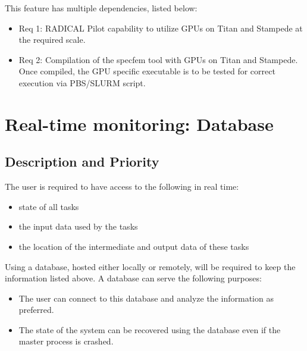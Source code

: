 \documentclass{scrreprt}
\begin{document}

This feature has multiple dependencies, listed below:

\begin{itemize}[noitemsep]
\item Req 1: RADICAL Pilot capability to utilize GPUs on Titan and Stampede at the required scale.
\item Req 2: Compilation of the specfem tool with GPUs on Titan and Stampede. Once compiled, the GPU specific executable is to be tested for correct execution via PBS/SLURM script.
\end{itemize}


\section{Real-time monitoring: Database}


\subsection{Description and Priority}

The user is required to have access to the following in real time:

\begin{itemize}[noitemsep]
\item state of all tasks
\item the input data used by the tasks
\item the location of the intermediate and output data of these tasks
\end{itemize}

Using a database, hosted either locally or remotely, will be required to keep the information listed above. A database can serve the following purposes:

\begin{itemize}[noitemsep]
\item The user can connect to this database and analyze the information as preferred.
\item The state of the system can be recovered using the database even if the master process is crashed.
\end{itemize}
\end{document}

